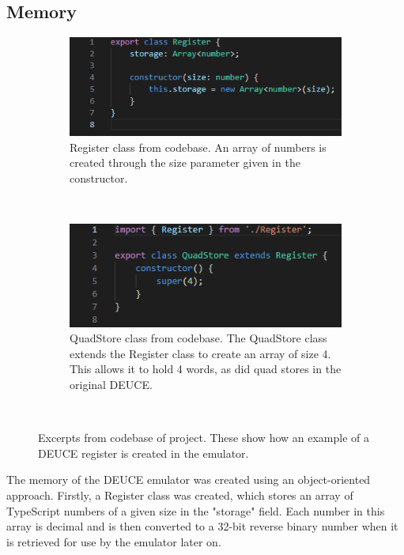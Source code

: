 \documentclass{l4proj}
\begin{document}
\subsection{Memory}
\begin{figure}[h]
	\centering
	\begin{subfigure}[t]{0.45\textwidth}
		\includegraphics[width=\textwidth]{images/register-class}
		\caption{Register class from codebase. An array of numbers is created through the size parameter given in the constructor.}
		\label{fig:reg-class}
	\end{subfigure}
	\quad
	~ %
	\begin{subfigure}[t]{0.45\textwidth}
		\includegraphics[width=\textwidth]{images/quad-store-class}
		\caption{QuadStore class from codebase. The QuadStore class extends the Register class to create an array of size 4. This allows it to hold 4 words, as did quad stores in the original DEUCE.}
		\label{fig:quad-class}
	\end{subfigure}
	~ %
	\caption{Excerpts from codebase of project. These show how an example of a DEUCE register is created in the emulator.}
	\label{fig:mem-classes}
\end{figure}
The memory of the DEUCE emulator was created using an object-oriented approach. Firstly, a Register class was created, which stores an array of TypeScript numbers of a given size in the "storage" field. Each number in this array is decimal and is then converted to a 32-bit reverse binary number when it is retrieved for use by the emulator later on. 
\end{document}
